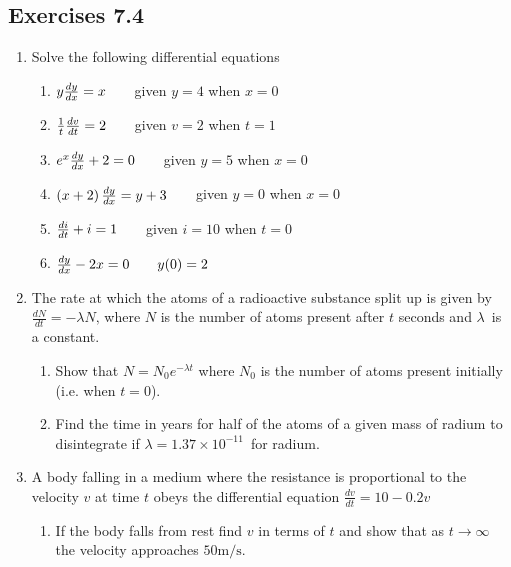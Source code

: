\subsection{Exercises 7.4}
\begin{enumerate}
\item Solve the following differential equations 


\begin{enumerate}
\item $y \frac{d y}{d x} =x\text{\quad \quad }$given $y =4$ when $x =0$ 

\item $\frac{1}{t} \frac{d v}{d t} =2\text{\quad \quad }$given $v =2$ when $t =1$ 

\item $e^{x} \frac{d y}{d x} +2 =0\text{\quad \quad }$given $y =5$ when $x =0$ 

\item $\left (x +2\right ) \frac{d y}{d x} =y +3\text{\quad \quad }$given $y =0$ when $x =0$ 

\item $\frac{d i}{d t} +i =1\text{\quad \quad }$given $i =10$ when $t =0$ 

\item $\frac{d y}{d x} -2 x =0\text{\quad \quad }y (0) =2$ \end{enumerate}


\item The rate at which the atoms
of a radioactive substance split up is given by $\frac{d N}{d t} = -\lambda  N\text{,}$ where $N$ is the number of atoms present after $t$ seconds and $\lambda $\ is a constant. 


\begin{enumerate}
\item Show that $N =N_{0} e^{ -\lambda  t}$ where $N_{0}$ is the number of atoms present initially (i.e. when $t =0$). 

\item Find the time in years for half of the atoms of a given mass of
radium to disintegrate if $\lambda  =1.37 \times 10^{ -11}$\ for radium. \end{enumerate}


\item A
body falling in a medium where the resistance is proportional to the velocity $v$ at time $t$ obeys the differential equation $\frac{d v}{d t} =10 -0.2 v$ 


\begin{enumerate}
\item If the body falls from rest find $v$ in terms of $t$ and show that as $t \rightarrow \infty $ the velocity approaches $50 \mathrm{m}/\mbox{s}$. 


\end{enumerate}
\end{enumerate}

